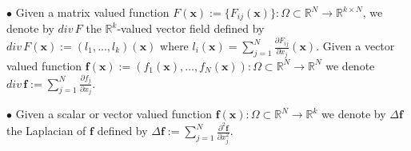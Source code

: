 \documentclass{article}
\theoremstyle{definition}
\theoremstyle{remark}
\renewcommand{\O}{\Omega}
\renewcommand{\vec}[1]{\mathbf{#1}}
\newcommand{\R}{\mathbb{R}}
\renewcommand{\O}{\Omega}
\renewcommand{\O}{\Omega}
\newcommand{\R}{{\mathbb{R}}}
\begin{document}
\noindent$\bullet$ Given a matrix valued function $F(\vec
x):=\{F_{ij}(\vec x)\}:\O\subset\R^N\to\R^{k\times N}$,
we denote by ${div}\, F$ the $\R^k$-valued vector field defined by
$div\,F(\vec x):=(l_1,\ldots,l_k)(\vec x)$ where $l_i(\vec
x)=\sum\limits_{j=1}^{N}\frac{\partial F_{ij}}{\partial x_j}(\vec
x)$. Given a vector valued function $\vec f(\vec
x):=\left(f_{1}(\vec x),\ldots, f_{N}(\vec
x)\right):\O\subset\R^N\to\R^{N}$ we denote
${div}\, \vec f:=\sum\limits_{j=1}^{N}\frac{\partial f_j}{\partial
x_j}$.

\noindent$\bullet$ Given a scalar or vector valued function $\vec
f(\vec x):\O\subset\R^N\to\R^{k}$ we denote by $\Delta \vec f$ the
Laplacian of $\vec f$ defined by $\Delta \vec
f:=\sum\limits_{j=1}^{N}\frac{\partial^2\vec  f}{\partial x^2_j}$.
\end{document}
